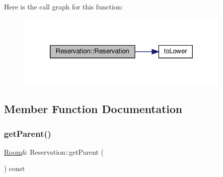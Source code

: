 Here is the call graph for this function\+:\nopagebreak
\begin{figure}[H]
\begin{center}
\leavevmode
\includegraphics[width=295pt]{class_reservation_ac6d26e98f82dcb33a52b64719160fb82_cgraph}
\end{center}
\end{figure}


\subsection{Member Function Documentation}
\mbox{\label{class_reservation_ae2c3cb8475f8649e3d44c076d6340c2c}} 
\subsubsection{\texorpdfstring{get\+Parent()}{getParent()}}
{\footnotesize\ttfamily \hyperlink{class_room}{Room}\& Reservation\+::get\+Parent (\begin{DoxyParamCaption}{ }\end{DoxyParamCaption}) const\hspace{0.3cm}{\ttfamily [inline]}}

